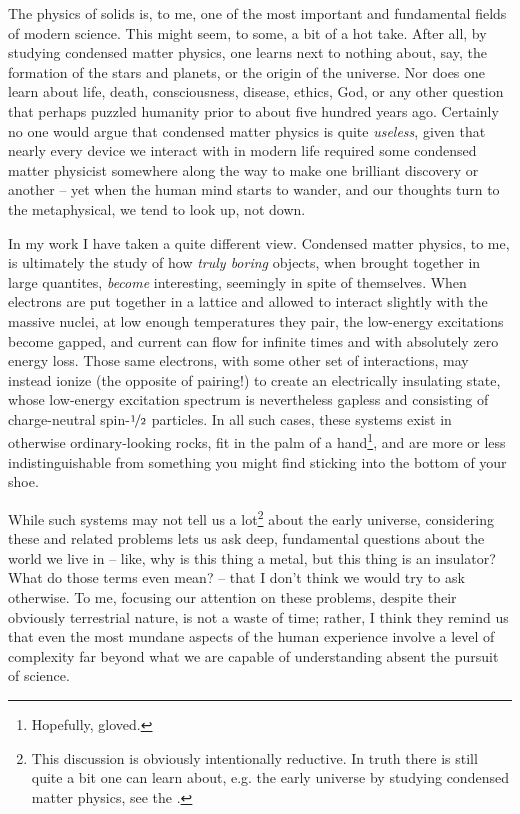 The physics of solids is, to me, one of the most important and fundamental fields of modern science.
This might seem, to some, a bit of a hot take.
After all, by studying condensed matter physics, one learns next to nothing about, say, the formation of the stars and planets, or the origin of the universe.
Nor does one learn about life, death, consciousness, disease, ethics, God, or any other question that perhaps puzzled humanity prior to about five hundred years ago.
Certainly no one would argue that condensed matter physics is quite \emph{useless}, given that nearly every device we interact with in modern life required some condensed matter physicist somewhere along the way to make one brilliant discovery or another -- yet when the human mind starts to wander, and our thoughts turn to the metaphysical, we tend to look up, not down.

In my work I have taken a quite different view.
Condensed matter physics, to me, is ultimately the study of how \textit{truly boring} objects, when brought together in large quantites, \textit{become} interesting, seemingly in spite of themselves.
When electrons are put together in a lattice and allowed to interact slightly with the massive nuclei, at low enough temperatures they pair, the low-energy excitations become gapped, and current can flow for infinite times and with absolutely zero energy loss.
Those same electrons, with some other set of interactions, may instead ionize (the opposite of pairing!) to create an electrically insulating state, whose low-energy excitation spectrum is nevertheless gapless and consisting of charge-neutral spin-$\nicefrac{1}{2}$ particles.
In all such cases, these systems exist in otherwise ordinary-looking rocks, fit in the palm of a hand\footnote{Hopefully, gloved.}, and are more or less indistinguishable from something you might find sticking into the bottom of your shoe.

While such systems may not tell us a lot\footnote{
    This discussion is obviously intentionally reductive.
    In truth there is still quite a bit one can learn about, e.g. the early universe by studying condensed matter physics, see the \citet{kibble_introduction_2008}.
}
about the early universe, considering these and related problems lets us ask deep, fundamental questions about the world we live in -- like, why is this thing a metal, but this thing is an insulator? What do those terms even mean? -- that I don't think we would try to ask otherwise.
To me, focusing our attention on these problems, despite their obviously terrestrial nature, is not a waste of time; rather, I think they remind us that even the most mundane aspects of the human experience involve a level of complexity far beyond what we are capable of understanding absent the pursuit of science.

